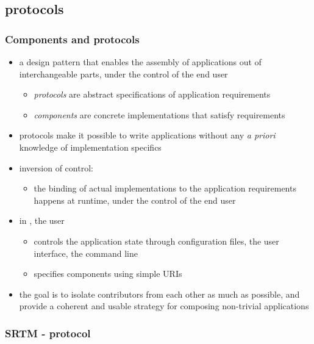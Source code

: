 \begin{frame}
%
  \frametitle{}
%
\end{frame}

\subsection{protocols}
\begin{frame}
%
  \frametitle{Components and protocols}
%
  \begin{itemize}
%
  \item a design pattern\supercite{patterns} that enables the assembly of applications out of
    interchangeable parts, under the control of the end user
      \begin{itemize}
      \item \emph{protocols} are abstract specifications of application requirements
      \item \emph{components} are concrete implementations that satisfy requirements
      \end{itemize}
%
    \item protocols make it possible to write applications without any \emph{a priori} knowledge
      of implementation specifics
%
    \item inversion of control\supercite{johnson-88}:
      \begin{itemize}
      \item the binding of actual implementations to the application requirements happens at
        runtime, under the control of the end user
      \end{itemize}
%
    \item in \pyre, the user
      \begin{itemize}
      \item controls the application state through configuration files, the user interface, the
        command line
      \item specifies components using simple URIs
      \end{itemize}
%
    \item the goal is to isolate contributors from each other as much as possible, and provide
      a coherent and usable strategy for composing non-trivial applications
%
  \end{itemize}
%
\end{frame}

\begin{frame}
%
  \frametitle{SRTM - protocol}
%
%
\end{frame}

